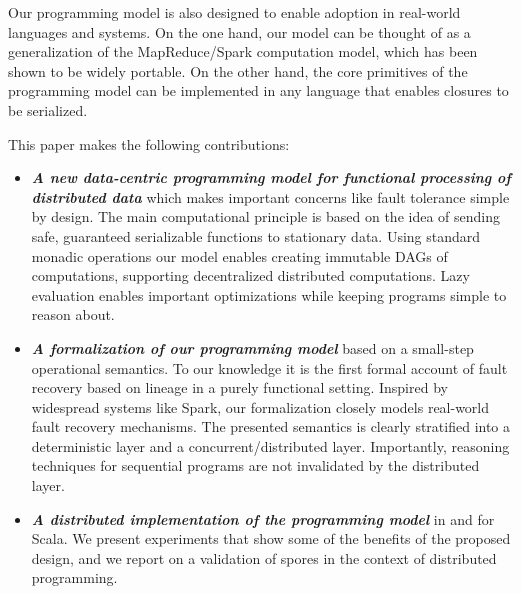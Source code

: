 \documentclass[preprint]{sigplanconf}
\theoremstyle{definition}
\theoremstyle{definition}
\begin{document}
Our programming model is also designed to enable adoption in real-world
languages and systems. On the one hand, our model can be thought of as a
generalization of the MapReduce/Spark computation model, which has been shown
to be widely portable. On the other hand, the core primitives of the
programming model can be implemented in any language that enables closures to
be serialized.




This paper makes the following contributions:
\begin{itemize} %

\item {\bf\em A new data-centric programming model for functional processing of
distributed data} which makes important concerns like fault tolerance simple by
design. The main computational principle is based on the idea of sending safe,
guaranteed serializable functions to stationary data. Using standard monadic
operations our model enables creating immutable DAGs of computations,
supporting decentralized distributed computations. Lazy evaluation enables
important optimizations while keeping programs simple to reason about.

\item {\bf\em A formalization of our programming model} based on a small-step
operational  semantics. To our knowledge it is the first formal account of
fault recovery based on lineage in a purely functional setting. Inspired by
widespread systems like Spark, our formalization closely models real-world
fault recovery mechanisms. The presented semantics is clearly stratified into
a deterministic layer and a concurrent/distributed layer. Importantly,
reasoning techniques for sequential programs are not invalidated by the
distributed layer.

\item {\bf\em A distributed implementation of the programming model} in and
for Scala. We present experiments that show some of the benefits of the
proposed design, and we report on a validation of spores in the context of
distributed programming.



\end{itemize}
\end{document}
